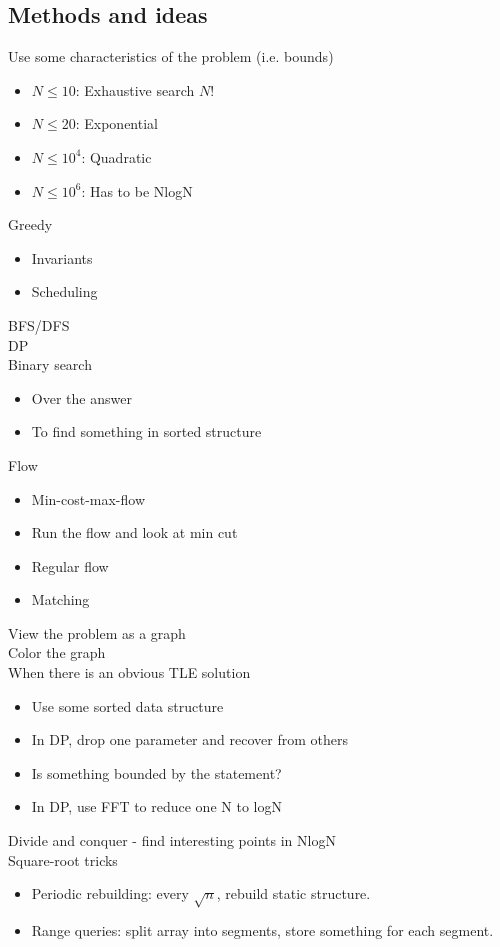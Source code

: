 \documentclass[8pt,a4paper,landscape,oneside]{amsart}
\begin{document}
\begin{multicols*}{2}
\begin{large}
\section{Methods and ideas}
\noindent
Use some characteristics of the problem (i.e. bounds)
\begin{itemize}
  \item $N\leq10$: Exhaustive search $N!$
  \item $N\leq20$: Exponential
  \item $N\leq 10^4$: Quadratic
  \item $N\leq 10^6$: Has to be NlogN
\end{itemize}
Greedy
\begin{itemize}
  \item Invariants
  \item Scheduling
\end{itemize}
BFS/DFS\\
DP\\
Binary search
\begin{itemize}
  \item Over the answer
  \item To find something in sorted structure
\end{itemize}
Flow
\begin{itemize}
  \item Min-cost-max-flow
  \item Run the flow and look at min cut
  \item Regular flow
  \item Matching
\end{itemize}
View the problem as a graph\\
Color the graph\\
When there is an obvious TLE solution
\begin{itemize}
  \item Use some sorted data structure
  \item In DP, drop one parameter and recover from others
  \item Is something bounded by the statement?
  \item In DP, use FFT to reduce one N to logN
\end{itemize}
Divide and conquer - find interesting points in NlogN\\
Square-root tricks
\begin{itemize}
  \item Periodic rebuilding: every $\sqrt{n}$, rebuild static structure.
  \item Range queries: split array into segments, store something for each segment.

\end{itemize}
\end{large}
\end{multicols*}
\end{document}
